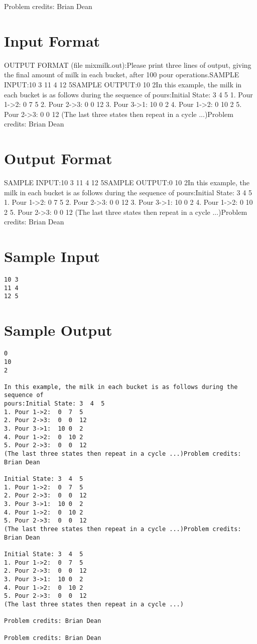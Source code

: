 \documentclass[12pt]{article}
\begin{document}
Problem credits: Brian Dean



\section*{Input Format}
OUTPUT FORMAT (file mixmilk.out):Please print three lines of output, giving the final amount of milk in each
bucket, after  100 pour operations.SAMPLE INPUT:10 3
11 4
12 5SAMPLE OUTPUT:0
10
2In this example, the milk in each bucket is as follows during the sequence of
pours:Initial State: 3  4  5
1. Pour 1->2:  0  7  5
2. Pour 2->3:  0  0  12
3. Pour 3->1:  10 0  2
4. Pour 1->2:  0  10 2
5. Pour 2->3:  0  0  12
(The last three states then repeat in a cycle ...)Problem credits: Brian Dean

\section*{Output Format}
SAMPLE INPUT:10 3
11 4
12 5SAMPLE OUTPUT:0
10
2In this example, the milk in each bucket is as follows during the sequence of
pours:Initial State: 3  4  5
1. Pour 1->2:  0  7  5
2. Pour 2->3:  0  0  12
3. Pour 3->1:  10 0  2
4. Pour 1->2:  0  10 2
5. Pour 2->3:  0  0  12
(The last three states then repeat in a cycle ...)Problem credits: Brian Dean

\section*{Sample Input}
\begin{verbatim}
10 3
11 4
12 5
\end{verbatim}

\section*{Sample Output}
\begin{verbatim}
0
10
2

In this example, the milk in each bucket is as follows during the sequence of
pours:Initial State: 3  4  5
1. Pour 1->2:  0  7  5
2. Pour 2->3:  0  0  12
3. Pour 3->1:  10 0  2
4. Pour 1->2:  0  10 2
5. Pour 2->3:  0  0  12
(The last three states then repeat in a cycle ...)Problem credits: Brian Dean

Initial State: 3  4  5
1. Pour 1->2:  0  7  5
2. Pour 2->3:  0  0  12
3. Pour 3->1:  10 0  2
4. Pour 1->2:  0  10 2
5. Pour 2->3:  0  0  12
(The last three states then repeat in a cycle ...)Problem credits: Brian Dean

Initial State: 3  4  5
1. Pour 1->2:  0  7  5
2. Pour 2->3:  0  0  12
3. Pour 3->1:  10 0  2
4. Pour 1->2:  0  10 2
5. Pour 2->3:  0  0  12
(The last three states then repeat in a cycle ...)

Problem credits: Brian Dean

Problem credits: Brian Dean
\end{verbatim}
\end{document}
